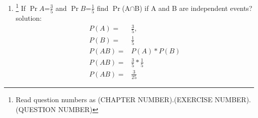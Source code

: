 \documentclass[10pt, a4paper]{article}
\title{\mytitle}
\author{\myauthor\hspace{1em}\\\contact\\FWC22088\hspace{6.5em}IITH\hspace{0.5em}\mymodule\hspace{6em}probability}
\begin{document}
	\maketitle
\begin{enumerate}[label=13.\arabic{enumi}.\arabic{enumii}]

\setcounter{enumi}{1}
\setcounter{enumii}{1}
\item \footnote{Read question numbers as (CHAPTER NUMBER).(EXERCISE NUMBER).(QUESTION NUMBER)} If $\Pr{A}$=$\frac{3}{5}$ and $\Pr{B}$=$\frac{1}{5}$ find $\Pr$(A$\cap$B) if A and B are independent events?\\
solution:
\begin{align}
P(A) =& \frac{3}{5},\\P(B)=&\frac{1}{5}\\
P(AB) = &P(A)*P(B)\\
P(AB) = &\frac{3}{5}*\frac{1}{5}\\
P(AB) = &\frac{3}{25}
\end{align}
\end{enumerate}
\end{document}
